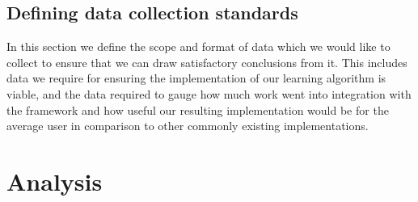 \subsection{Defining data collection standards}
In this section we define the scope and format of data which we would like to collect to ensure that we can draw satisfactory conclusions from it. This includes data we require for ensuring the implementation of our learning algorithm is viable, and the data required to gauge how much work went into integration with the framework and how useful our resulting implementation would be for the average user in comparison to other commonly existing implementations.





\section{Analysis}


